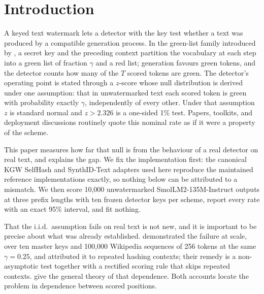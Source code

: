 \documentclass[conference]{IEEEtran}
\begin{document}
\section{Introduction}

A keyed text watermark lets a detector with the key test whether a text was
produced by a compatible generation process. In the green-list family introduced
by \citet{kirchenbauer2023watermark}, a secret key and the preceding context
partition the vocabulary at each step into a green list of fraction $\gamma$ and a
red list; generation favours green tokens, and the detector counts how many of the
$T$ scored tokens are green. The detector's operating point is stated through a
$z$-score whose null distribution is derived under one assumption: that in
unwatermarked text each scored token is green with probability exactly $\gamma$,
independently of every other. Under that assumption $z$ is standard normal and
$z>2.326$ is a one-sided 1\% test. Papers, toolkits, and deployment discussions
routinely quote this nominal rate as if it were a property of the scheme.

This paper measures how far that null is from the behaviour of a real detector on
real text, and explains the gap. We fix the implementation first: the canonical
KGW SelfHash and SynthID-Text adapters used here reproduce the maintained
reference implementations exactly, so nothing below can be attributed to a
mismatch. We then score 10,000 unwatermarked SmolLM2-135M-Instruct outputs at
three prefix lengths with ten frozen detector keys per scheme, report every rate
with an exact 95\% interval, and fit nothing.

That the i.i.d.\ assumption fails on real text is not new, and it is important to
be precise about what was already established. \citet{fernandez2023bricks}
demonstrated the failure at scale, over ten master keys and 100{,}000 Wikipedia
sequences of 256 tokens at the same $\gamma=0.25$, and attributed it to repeated
hashing contexts; their remedy is a non-asymptotic test together with a rectified
scoring rule that skips repeated contexts. \citet{cai2025collision} give the
general theory of that dependence. Both accounts locate the problem in dependence
between scored positions.
\end{document}
